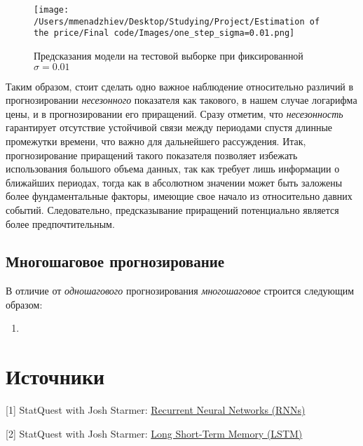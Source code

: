 \begin{figure}[H]
    \centering
    \texttt{[image: /Users/mmenadzhiev/Desktop/Studying/Project/Estimation of the price/Final code/Images/one\_step\_sigma=0.01.png]}
    \caption{Предсказания модели на тестовой выборке при фиксированной $\sigma = 0.01$}
\end{figure}

Таким образом, стоит сделать одно важное наблюдение относительно различий в прогнозировании \textit{несезонного} показателя как такового, в нашем случае логарифма цены, и в прогнозировании его приращений. Сразу отметим, что \textit{несезонность} гарантирует отсутствие устойчивой связи между периодами спустя длинные промежутки времени, что важно для дальнейшего рассуждения. Итак, прогнозирование приращений такого показателя позволяет избежать использования большого объема данных, так как требует лишь информации о ближайших периодах, тогда как в абсолютном значении может быть заложены более фундаментальные факторы, имеющие свое начало из относительно давних событий. Следовательно, предсказывание приращений потенциально является более предпочтительным.

\subsection{Многошаговое прогнозирование}

В отличие от \textit{одношагового} прогнозирования \textit{многошаговое} строится следующим образом:

\vspace{-15pt}

\begin{enumerate}
    
    \item

\end{enumerate}


\section{Источники}

[1] StatQuest with Josh Starmer: \href{https://youtu.be/AsNTP8Kwu80?si=N-Snml3hPPGoP0i3}{Recurrent Neural Networks (RNNs)}

[2] StatQuest with Josh Starmer: \href{https://www.youtube.com/watch?v=YCzL96nL7j0&list=PLblh5JKOoLUIxGDQs4LFFD--41Vzf-ME1&index=16&ab_channel=StatQuestwithJoshStarmer}{Long Short-Term Memory (LSTM)}


